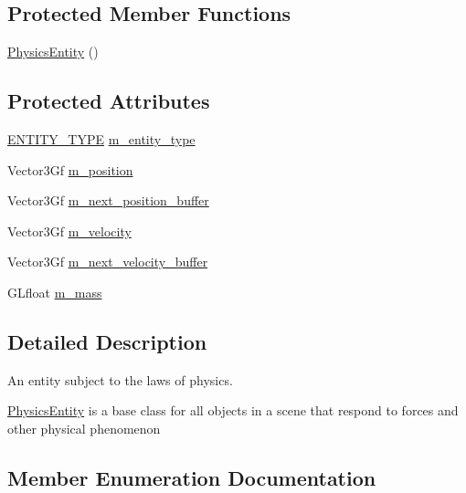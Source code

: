 \subsection*{Protected Member Functions}
\begin{DoxyCompactItemize}
\item 
\hyperlink{classPhysicsEntity_a2c0cf9804f1864105849586bc91e8dea}{Physics\+Entity} ()
\end{DoxyCompactItemize}
\subsection*{Protected Attributes}
\begin{DoxyCompactItemize}
\item 
\hyperlink{classPhysicsEntity_a171840d3fef1fc21c3f922b240e03538}{E\+N\+T\+I\+T\+Y\+\_\+\+T\+Y\+PE} \hyperlink{classPhysicsEntity_a71e8887fb5fd67e84b39d99dae634daf}{m\+\_\+entity\+\_\+type}
\item 
Vector3\+Gf \hyperlink{classPhysicsEntity_afee5026bb0c5504697b7a6c4c59d8003}{m\+\_\+position}
\item 
Vector3\+Gf \hyperlink{classPhysicsEntity_abc38c58fd803d67079f25043331f0018}{m\+\_\+next\+\_\+position\+\_\+buffer}
\item 
Vector3\+Gf \hyperlink{classPhysicsEntity_ad03f63872ec7c9ddf734e92034d6e112}{m\+\_\+velocity}
\item 
Vector3\+Gf \hyperlink{classPhysicsEntity_a00034d95cc1a6f34ceaf5ad961e4afe6}{m\+\_\+next\+\_\+velocity\+\_\+buffer}
\item 
G\+Lfloat \hyperlink{classPhysicsEntity_a5a7bc5174169e169f69723d2483c2eff}{m\+\_\+mass}
\end{DoxyCompactItemize}


\subsection{Detailed Description}
An entity subject to the laws of physics. 

\hyperlink{classPhysicsEntity}{Physics\+Entity} is a base class for all objects in a scene that respond to forces and other physical phenomenon 

\subsection{Member Enumeration Documentation}
\mbox{\label{classPhysicsEntity_a171840d3fef1fc21c3f922b240e03538}} 
